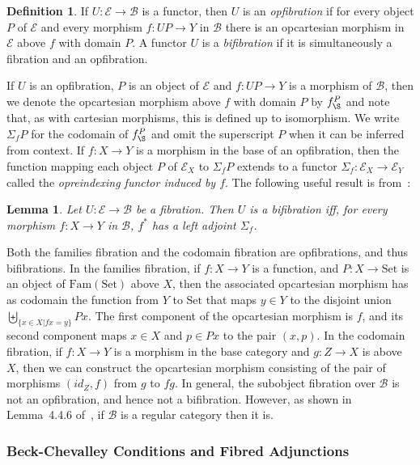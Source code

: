 \documentclass{LMCS}
\newcommand{\ra}{\rightarrow}
\newcommand{\Set}{\mbox{Set}}
\newcommand{\Fam}{\mbox{Fam}}
\newcommand\E{{\mathcal E}}
\newcommand\B{{\mathcal B}}
\theoremstyle{plain}
\newtheorem{lemma}[theorem]{Lemma}
\theoremstyle{remark}
\theoremstyle{definition}
\newtheorem{definition}[theorem]{Definition}
\begin{document}
\begin{definition}
  If $U : \E \ra \B$ is a functor, then $U$ is an {\em opfibration} if
  for every object $P$ of $\E$ and every morphism $f : UP \ra Y$ in
  $\B$ there is an opcartesian morphism in $\E$ above $f$ with domain
  $P$.  A functor $U$ is a {\em bifibration} if it is simultaneously a
  fibration and an opfibration.
\end{definition}
If $U$ is an opfibration, $P$ is an object of $\E$ and $f : UP \ra Y$
is a morphism of $\B$, then we denote the opcartesian morphism above
$f$ with domain $P$ by $f_\S^P$ and note that, as with cartesian
morphisms, this is defined up to isomorphism. We write $\Sigma_fP$ for
the codomain of $f_\S^P$ and omit the superscript $P$ when it can be
inferred from context.  If $f:X \ra Y$ is a morphism in the base of an
opfibration, then the function mapping each object $P$ of $\E_X$ to
$\Sigma_f P$ extends to a functor $\Sigma_f : \E_X \to \E_Y$ called
the {\em opreindexing functor induced by $f$}. The following useful
result is from~\cite{jac93}:
\begin{lemma}\label{lem:bifdef}
  Let $U: \E \ra \B$ be a fibration. Then $U$ is a bifibration iff,
  for every morphism $f:X \ra Y$ in $\B$, $f^*$ has a left adjoint
  $\Sigma_f$.
\end{lemma}

Both the families fibration and the codomain fibration are
opfibrations, and thus bifibrations. In the families fibration, if
$f:X \ra Y$ is a function, and $P:X \ra \Set$ is an object of
$\Fam(\Set)$ above $X$, then the associated opcartesian morphism has
as codomain the function from $Y$ to $\Set$ that maps $y \in Y$ to the
disjoint union $\biguplus_{\{x \in X | f x = y\}} P x$. The first
component of the opcartesian morphism is $f$, and its second component
maps $x \in X$ and $p \in Px$ to the pair $(x,p)$.  In the codomain
fibration, if $f:X \ra Y$ is a morphism in the base category and $g:Z
\ra X$ is above $X$, then we can construct the opcartesian morphism
consisting of the pair of morphisms $(id_Z, f)$ from $g$ to $fg$. In
general, the subobject fibration over $\B$ is not an opfibration, and
hence not a bifibration. However, as shown in Lemma~4.4.6
of~\cite{jac99}, if $\B$ is a regular category then it is.







\subsubsection{Beck-Chevalley Conditions and Fibred Adjunctions}    
\end{document}
